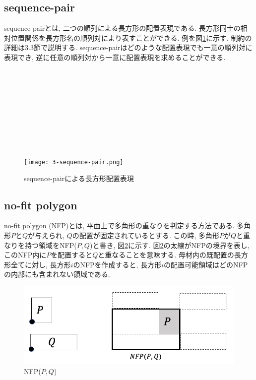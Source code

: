 \subsection{sequence-pair}
sequence-pairとは, 二つの順列による長方形の配置表現である\cite{seq-pair}. 
長方形同士の相対位置関係を長方形名の順列対により表すことができる. 
例を図\ref{s-p-eg}に示す. 制約の詳細は3.3節で説明する. 
sequence-pairはどのような配置表現でも一意の順列対に表現でき, 逆に任意の順列対から一意に配置表現を求めることができる. \\ 
\\
\\ \\ \\ \\ \\ \\ \\ \\ 
\begin{figure}[hb]
    \hspace{2cm}
    \texttt{[image: 3-sequence-pair.png]}
    \caption{sequence-pairによる長方形配置表現}
    \label{s-p-eg}
\end{figure}


\subsection{no-fit polygon}
no-fit polygon (NFP)とは, 平面上で多角形の重なりを判定する方法である\cite{nfp}\cite{nfp2}. 
多角形$P$と$Q$が与えられ, $Q$の配置が固定されているとする. 
この時, 多角形$P$が$Q$と重なりを持つ領域をNFP($P,Q$)と書き, 図\ref{nfp-eg}に示す. 
図\ref{nfp-eg}の太線がNFPの境界を表し, このNFP内に$P$を配置すると$Q$と重なることを意味する. 
母材内の既配置の長方形全てに対し, 長方形$i$のNFPを作成すると, 長方形$i$の配置可能領域はどのNFPの内部にも含まれない領域である. \\

\begin{figure}[tbp]
    \hspace{3cm}
    \includegraphics[scale = 0.3, bb=0 0 10 10]{3nfp.png}
    \caption{NFP($P,Q$)}
    \label{nfp-eg}
\end{figure}


